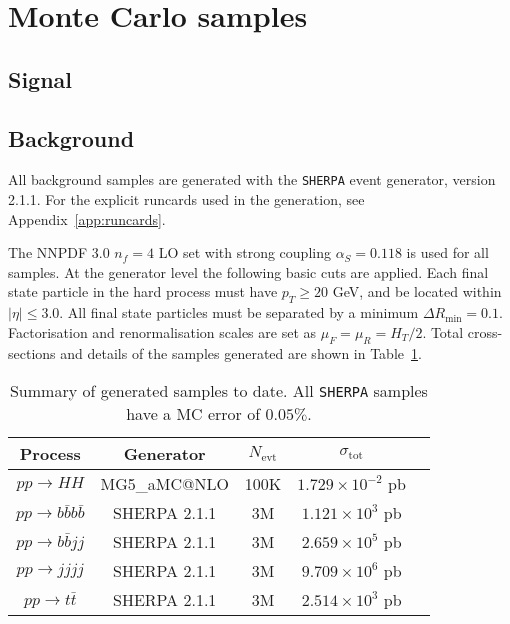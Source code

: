 \section{Monte Carlo samples}

\subsection{Signal}

\subsection{Background}
All background samples are generated with the {\tt SHERPA} event generator, version 2.1.1. For the explicit runcards used in the generation, see Appendix~\ref{app:runcards}.

The NNPDF 3.0 $n_f = 4$ LO set with strong coupling $\alpha_S=0.118$ is used for all samples. At the generator level the following basic cuts are applied. Each final state particle in the hard process must have $p_T \ge 20$ GeV, and be located within $| \eta | \le 3.0$. All final state particles must be separated by a minimum $\Delta R_{\mathrm{min}} =0.1$. Factorisation and renormalisation scales are set as $\mu_F=\mu_R=H_T/2$. Total cross-sections and details of the samples generated are shown in Table~\ref{tab:samples}. 


\begin{table}[h]
\begin{center}
\begin{tabular}{|c|c|c|c|c|}
\hline
Process &  Generator & $N_{\mathrm{evt}}$ & $\sigma_{\mathrm{tot}}$ \\
\hline
\hline
$pp \to HH$ &  MG5\_aMC@NLO & 100K & $1.729\times10^{-2}$ pb \\
\hline
$pp \to b\bar{b}b\bar{b}$ &  SHERPA 2.1.1 & 3M &$1.121 \times10^3$ pb \\
$pp \to b\bar{b}jj$ &  SHERPA 2.1.1 & 3M & $2.659 \times 10^5$ pb \\
$pp \to jjjj$ &  SHERPA 2.1.1 & 3M  & $9.709\times 10^6$ pb \\
$pp \to t\bar{t}$ &  SHERPA 2.1.1 & 3M & $2.514\times 10^3$ pb \\
\hline
\end{tabular}
\caption{Summary of generated samples to date. All {\tt SHERPA} samples have a MC error of $0.05\%$.} \label{tab:samples}
\end{center}
\end{table}%

